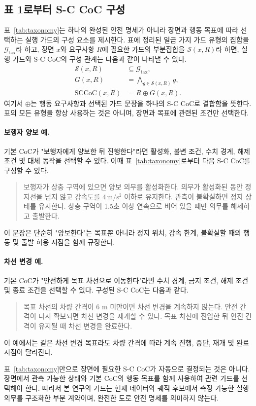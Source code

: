 \subsection{표 1로부터 S-C CoC 구성}

표~\ref{tab:taxonomy}는 하나의 완성된 안전 명세가 아니라 장면과 행동 목표에 따라 선택하는 실행 가드의 구성 요소를 제시한다. 표에 정리된 일곱 가지 가드 유형의 집합을 $\mathcal{G}_{\mathrm{tax}}$라 하고, 장면 $x$와 요구사항 $R$에 필요한 가드의 부분집합을 $\mathcal{S}(x,R)$라 하면, 실행 가드와 S-C CoC의 구성 관계는 다음과 같이 나타낼 수 있다.
\begin{equation}
\begin{aligned}
\mathcal{S}(x,R)&\subseteq\mathcal{G}_{\mathrm{tax}},\\
G(x,R)&=\bigwedge_{g\in\mathcal{S}(x,R)}g,\\
\mathrm{SCCoC}(x,R)&=R\oplus G(x,R).
\end{aligned}
\label{eq:sccoc-compose}
\end{equation}
여기서 $\oplus$는 행동 요구사항과 선택된 가드 문장을 하나의 S-C CoC로 결합함을 뜻한다. 표의 모든 유형을 항상 사용하는 것은 아니며, 장면과 목표에 관련된 조건만 선택한다.

\paragraph{보행자 양보 예.}
기본 CoC가 "보행자에게 양보한 뒤 진행한다"라면 활성화, 불변 조건, 수치 경계, 해제 조건 및 대체 동작을 선택할 수 있다. 이때 표~\ref{tab:taxonomy}로부터 다음 S-C CoC를 구성할 수 있다.
\begin{quote}
\small
보행자가 상충 구역에 있으면 양보 의무를 활성화한다. 의무가 활성화된 동안 정지선을 넘지 않고 감속도를 $4\,\mathrm{m/s^2}$ 이하로 유지한다. 관측이 불확실하면 정지 상태를 유지한다. 상충 구역이 1.5초 이상 연속으로 비어 있을 때만 의무를 해제하고 출발한다.
\end{quote}
이 문장은 단순히 "양보한다"는 목표뿐 아니라 정지 위치, 감속 한계, 불확실할 때의 행동 및 출발 허용 시점을 함께 규정한다.

\paragraph{차선 변경 예.}
기본 CoC가 "안전하게 목표 차선으로 이동한다"라면 수치 경계, 금지 조건, 해제 조건 및 종료 조건을 선택할 수 있다. 구성된 S-C CoC는 다음과 같다.
\begin{quote}
\small
목표 차선의 차량 간격이 6 m 미만이면 차선 변경을 계속하지 않는다. 안전 간격이 다시 확보되면 차선 변경을 재개할 수 있다. 목표 차선에 진입한 뒤 안전 간격이 유지될 때 차선 변경을 완료한다.
\end{quote}
이 예에서는 같은 차선 변경 목표라도 차량 간격에 따라 계속 진행, 중단, 재개 및 완료 시점이 달라진다.

표~\ref{tab:taxonomy}만으로 장면에 필요한 S-C CoC가 자동으로 결정되는 것은 아니다. 장면에서 관측 가능한 상태와 기본 CoC의 행동 목표를 함께 사용하여 관련 가드를 선택해야 한다. 따라서 본 연구의 가드는 현재 데이터와 궤적 후보에서 측정 가능한 실행 의무를 구조화한 부분 계약이며, 완전한 도로 안전 명세를 의미하지 않는다.
